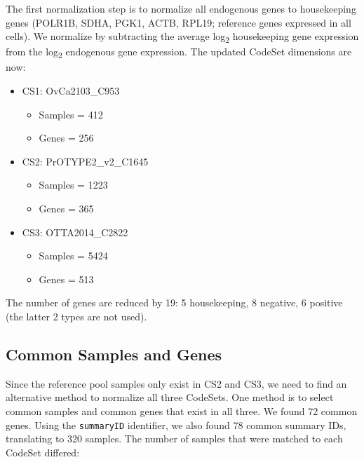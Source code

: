 \documentclass[
]{report}
\providecommand{\tightlist}{%
  \setlength{\itemsep}{0pt}\setlength{\parskip}{0pt}}
\begin{document}
The first normalization step is to normalize all endogenous genes to housekeeping genes (POLR1B, SDHA, PGK1, ACTB, RPL19; reference genes expressed in all cells). We normalize by subtracting the average log\textsubscript{2} housekeeping gene expression from the log\textsubscript{2} endogenous gene expression. The updated CodeSet dimensions are now:

\begin{itemize}
\tightlist
\item
  CS1: OvCa2103\_C953

  \begin{itemize}
  \tightlist
  \item
    Samples = 412
  \item
    Genes = 256
  \end{itemize}
\item
  CS2: PrOTYPE2\_v2\_C1645

  \begin{itemize}
  \tightlist
  \item
    Samples = 1223
  \item
    Genes = 365
  \end{itemize}
\item
  CS3: OTTA2014\_C2822

  \begin{itemize}
  \tightlist
  \item
    Samples = 5424
  \item
    Genes = 513
  \end{itemize}
\end{itemize}

The number of genes are reduced by 19: 5 housekeeping, 8 negative, 6 positive (the latter 2 types are not used).

\hypertarget{common-samples-and-genes}{%
\subsection{Common Samples and Genes}\label{common-samples-and-genes}}

Since the reference pool samples only exist in CS2 and CS3, we need to find an alternative method to normalize all three CodeSets. One method is to select common samples and common genes that exist in all three. We found 72 common genes. Using the \texttt{summaryID} identifier, we also found 78 common summary IDs, translating to 320 samples. The number of samples that were matched to each CodeSet differed:
\end{document}

